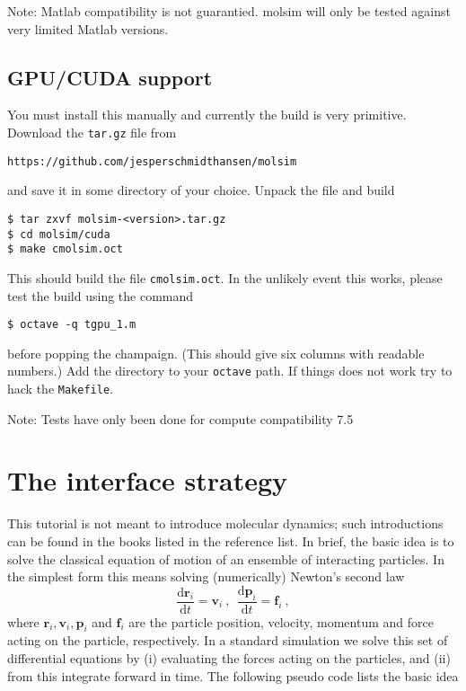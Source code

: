 \documentclass[11pt]{article}
\begin{document}
\bigskip

\noindent Note: Matlab compatibility is not guarantied. \textsf{molsim} will
only be tested against very limited Matlab versions.

\subsection{GPU/CUDA support}
You must install this manually and currently the build is very primitive. 
Download the \verb!tar.gz! file from
\begin{verbatim}
https://github.com/jesperschmidthansen/molsim
\end{verbatim}
and save it in some directory of your choice. Unpack the file and build 
\begin{verbatim}
$ tar zxvf molsim-<version>.tar.gz
$ cd molsim/cuda
$ make cmolsim.oct
\end{verbatim}
This should build the file \verb!cmolsim.oct!.
In the unlikely event this works, please test the build using the command
\begin{verbatim}
$ octave -q tgpu_1.m	
\end{verbatim}
before popping the champaign. (This should give six columns with readable numbers.)
Add the directory to your \verb!octave! path. If things does not work 
try to hack the \verb!Makefile!. 

\bigskip 

\noindent Note: Tests have only been done for compute compatibility 7.5   

\section{The interface strategy}
This tutorial is not meant to introduce molecular dynamics; such introductions
can be found in the books listed in the reference list. In brief, the basic idea
is to solve the classical equation of motion of an ensemble of interacting
particles. In the simplest form this means solving (numerically) Newton's second
law
\begin{equation}
  \frac{\mathrm{d}\mathbf{r}_i}{\mathrm{d} t} = \mathbf{v}_i \ , \ \
  \frac{\mathrm{d}\mathbf{p}_i}{\mathrm{d} t} = \mathbf{f}_i \ ,
\end{equation}
where $\mathbf{r}_i, \mathbf{v}_i, \mathbf{p}_i$ and $\mathbf{f}_i$ are the
particle position, velocity, momentum and force acting on the particle, respectively. In a
standard simulation we solve this set of differential equations by (i)
evaluating the forces acting on the particles, and (ii) from this integrate
forward in time. The following pseudo code lists the basic idea
\end{document}
